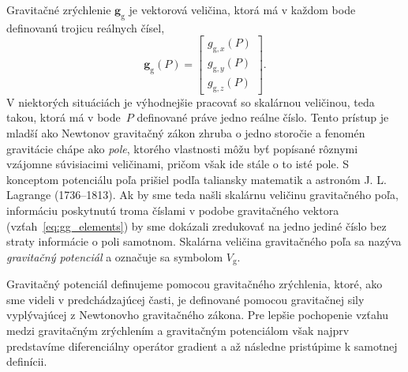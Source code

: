 \documentclass[a4paper, 12pt]{book}
\newcommand{\gidx}{\mathrm g}
\let\vec\mathbf
\begin{document}
Gravitačné zrýchlenie $\vec g_\gidx$ je vektorová veličina, ktorá má v každom 
bode definovanú trojicu reálnych čísel,
%
\begin{equation}
\label{eq:gg_elements}
\vec g_{\gidx}(P) =
\begin{bmatrix}
g_{\gidx,x}(P) \\[2ex]
g_{\gidx,y}(P) \\[2ex]
g_{\gidx,z}(P)
\end{bmatrix}
{.}
\end{equation}
%
V niektorých situáciách je výhodnejšie pracovať so skalárnou veličinou, teda 
takou, ktorá má v bode~$P$ definované práve jedno reálne číslo.  Tento prístup 
je mladší ako Newtonov gravitačný zákon zhruba o jedno storočie 
\citep{MacMillan1930,Jekeli2015} a fenomén gravitácie chápe ako \emph{pole}, 
ktorého vlastnosti môžu byť popísané rôznymi vzájomne súvisiacimi veličinami, 
pričom však ide stále o to isté pole.  S konceptom potenciálu poľa prišiel 
podľa \cite{MacMillan1930} taliansky matematik a astronóm J. L. Lagrange 
(1736--1813).  Ak by sme teda našli skalárnu veličinu gravitačného poľa, 
informáciu poskytnutú troma číslami v podobe gravitačného vektora 
(vzťah~\ref{eq:gg_elements}) by sme dokázali zredukovať na jedno jediné číslo 
bez straty informácie o poli samotnom.  Skalárna veličina gravitačného poľa sa 
nazýva \emph{gravitačný potenciál} a označuje sa symbolom $V_\gidx$.

Gravitačný potenciál definujeme pomocou gravitačného zrýchlenia, ktoré, ako sme 
videli v predchádzajúcej časti, je definované pomocou gravitačnej sily 
vyplývajúcej z Newtonovho gravitačného zákona.  Pre lepšie pochopenie vzťahu 
medzi gravitačným zrýchlením a gravitačným potenciálom však najprv predstavíme 
diferenciálny operátor gradient a až následne pristúpime k samotnej definícii.
\end{document}
